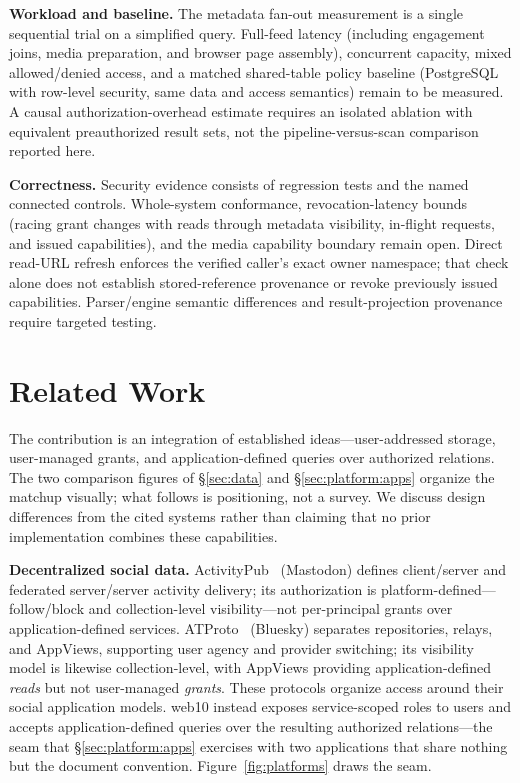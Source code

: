 \documentclass[sigconf, nonacm]{acmart}
\begin{document}
\textbf{Workload and baseline.} The metadata fan-out measurement is a single
sequential trial on a simplified query. Full-feed latency (including
engagement joins, media preparation, and browser page assembly), concurrent
capacity, mixed allowed/denied access, and a matched shared-table policy
baseline (PostgreSQL with row-level security, same data and access
semantics) remain to be measured. A causal authorization-overhead estimate
requires an isolated ablation with equivalent preauthorized result sets, not
the pipeline-versus-scan comparison reported here.

\textbf{Correctness.} Security evidence consists of regression tests and the
named connected controls. Whole-system conformance, revocation-latency bounds
(racing grant changes with reads through metadata visibility, in-flight
requests, and issued capabilities), and the media capability boundary remain
open. Direct read-URL refresh enforces the verified caller's exact owner
namespace; that check alone does not establish stored-reference provenance or
revoke previously issued capabilities. Parser/engine semantic differences
and result-projection provenance require targeted testing.

\section{Related Work}
\label{sec:related}

The contribution is an integration of established ideas---user-addressed
storage, user-managed grants, and application-defined queries over
authorized relations. The two comparison figures of \S\ref{sec:data} and
\S\ref{sec:platform:apps} organize the matchup visually; what follows is
positioning, not a survey. We discuss design differences from the cited
systems rather than claiming that no prior implementation combines these
capabilities.

\textbf{Decentralized social data.}
ActivityPub~\cite{activitypub2018} (Mastodon) defines client/server and
federated server/server activity delivery; its authorization is
platform-defined---follow/block and collection-level visibility---not
per-principal grants over application-defined services.
ATProto~\cite{kleppmann2024} (Bluesky) separates repositories, relays, and
AppViews, supporting user agency and provider switching; its visibility model
is likewise collection-level, with AppViews providing application-defined
\emph{reads} but not user-managed \emph{grants}. These protocols organize
access around their social application models. web10 instead exposes
service-scoped roles to users and accepts application-defined queries over
the resulting authorized relations---the seam that
\S\ref{sec:platform:apps} exercises with two applications that share nothing
but the document convention. Figure~\ref{fig:platforms} draws the seam.
\end{document}
